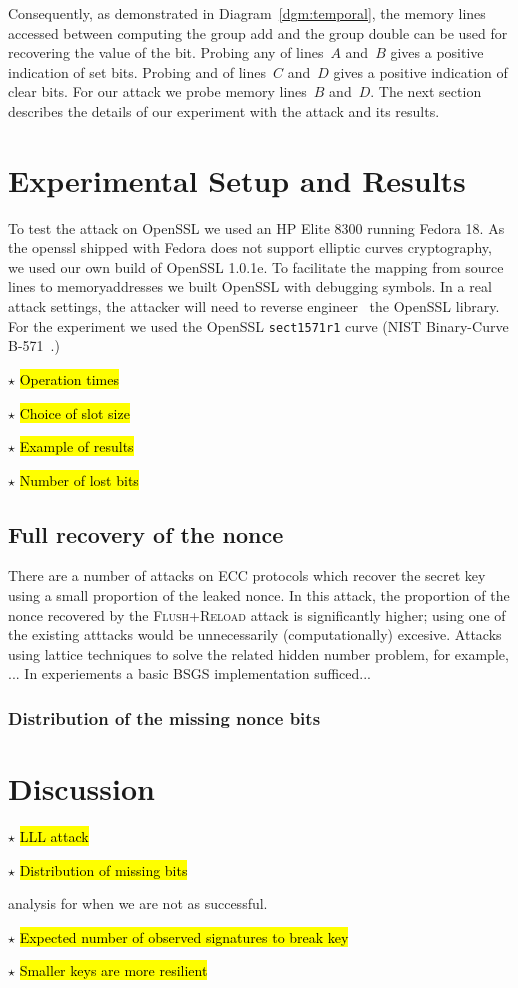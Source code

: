 \documentclass{llncs}
\newcommand{\starpar}[1]{\par{\footnotesize $\star$ \hl{#1}\par}}
\begin{document}
Consequently, as demonstrated in Diagram~\ref{dgm:temporal}, the memory lines accessed between computing
the group add and the group double can be used for recovering the value of the bit.
Probing any of lines~$A$ and~$B$ gives a positive indication of set bits.  
Probing and of lines~$C$ and~$D$ gives a positive indication of clear bits.
For our attack we probe memory lines~$B$ and~$D$.
The next section describes the details of our experiment with the attack and its results.


\section{Experimental Setup and Results}\label{sec:results}

To test the attack on OpenSSL we used an HP Elite 8300 
running Fedora 18.
As the openssl shipped with Fedora does not support elliptic curves cryptography,
we used our own build of OpenSSL 1.0.1e. 
To facilitate the mapping from source lines to memoryaddresses we built OpenSSL with debugging symbols.
In a real attack settings, the attacker will need to reverse engineer~\cite{cipsero10software}
the OpenSSL library.
For the experiment we used the OpenSSL \texttt{sect1571r1} curve (NIST Binary-Curve B-571~\cite{fips}.)


\starpar{Operation times}
\starpar{Choice of slot size}
\starpar{Example of results}
\starpar{Number of lost bits}

\subsection{Full recovery of the nonce}\label{sub:full_nonce}
There are a number of attacks on ECC protocols which recover the secret key using a small proportion of the leaked nonce. In this attack, the proportion of the nonce recovered by the \textsc{Flush+Reload} attack is significantly higher; using one of the existing atttacks would be unnecessarily (computationally) excesive. Attacks using lattice techniques to solve the related hidden number problem, for example, ... 
In experiements a basic BSGS implementation sufficed... 

\subsubsection*{Distribution of the missing nonce bits}

\section{Discussion}\label{sec:discussion}
\starpar{LLL attack}
\starpar{Distribution of missing bits} analysis for when we are not as successful. 
\starpar{Expected number of observed signatures to break key}
\starpar{Smaller keys are more resilient}~\cite{walter04longer}
\end{document}
